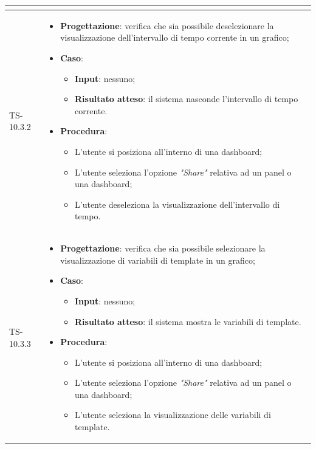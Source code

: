 \begin{longtable}{|C{2.5cm}|C{13cm}|}
\begin{itemize}
\end{itemize}
	  \\
	\hline
	{TS-10.3.2} &
\begin{itemize}
	\item \textbf{Progettazione}: verifica che sia possibile deselezionare la
	visualizzazione dell'intervallo di tempo corrente in un grafico;
	\item \textbf{Caso}: 
	\begin{itemize}
		\item \textbf{Input}: nessuno;
		\item \textbf{Risultato atteso}: il sistema nasconde l'intervallo di tempo corrente.
	\end{itemize}
	\item \textbf{Procedura}:
	\begin{itemize}
		\item L'utente si posiziona all'interno di una dashboard;
		\item L'utente seleziona l'opzione \emph{"Share"} relativa ad un panel o una dashboard;
		\item L'utente deseleziona la visualizzazione dell'intervallo di tempo.
	\end{itemize} 
\end{itemize}
	 \\
	\hline
	{TS-10.3.3} &
\begin{itemize}
	\item \textbf{Progettazione}: verifica che sia possibile selezionare la
	visualizzazione di variabili di template in un grafico;
	\item \textbf{Caso}: 
	\begin{itemize}
		\item \textbf{Input}: nessuno;
		\item \textbf{Risultato atteso}: il sistema mostra le variabili di template.
	\end{itemize}
	\item \textbf{Procedura}:
	\begin{itemize}
		\item L'utente si posiziona all'interno di una dashboard;
		\item L'utente seleziona l'opzione \emph{"Share"} relativa ad un panel o una dashboard;
		\item L'utente seleziona la visualizzazione delle variabili di template.
	\end{itemize} 
\end{itemize}
	  \\
	\hline

\end{longtable}
